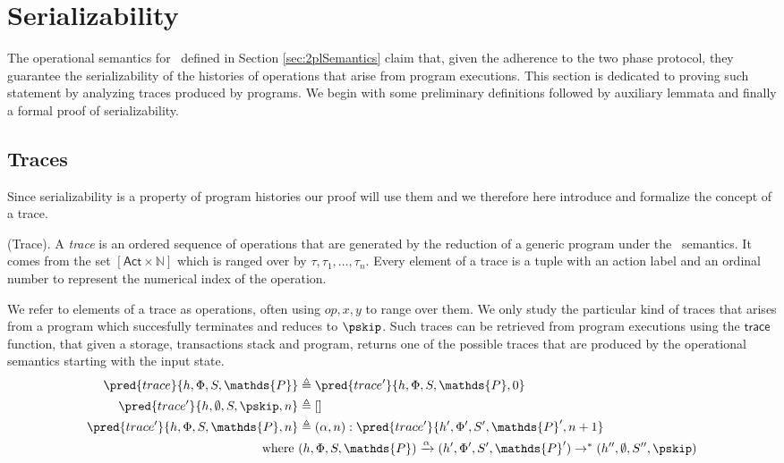 \section{Serializability}

\label{sec:ser}

The operational semantics for \tpl\ defined in Section \ref{sec:2plSemantics} claim that, given the adherence to the two phase protocol, they guarantee the serializability of the histories of operations that arise from program executions. This section is dedicated to proving such statement by analyzing traces produced by programs. We begin with some preliminary definitions followed by auxiliary lemmata and finally a formal proof of serializability.

\tocless\subsection{Traces}

Since serializability is a property of program histories our proof will use them and we therefore here introduce and formalize the concept of a trace.

\begin{defn}
	(Trace).
	A \emph{trace} is an ordered sequence of operations that are generated by the reduction of a generic program under the \tpl\ semantics. It comes from the set $[\mathsf{Act} \times \mathds{N}]$ which is ranged over by $\tau, \tau_1, \ldots, \tau_n$. Every element of a trace is a tuple with an action label and an ordinal number to represent the numerical index of the operation.
\end{defn}

We refer to elements of a trace as operations, often using $op, x, y$ to range over them. We only study the particular kind of traces that arises from a program which succesfully terminates and reduces to $\pskip$. Such traces can be retrieved from program executions using the $\mathsf{trace}$ function, that given a storage, transactions stack and program, returns one of the possible traces that are produced by the operational semantics starting with the input state.
\begin{align*}
	\pred{trace}{h, \Phi, S, \mathds{P}} &\triangleq \pred{trace'}{h, \Phi, S, \mathds{P}, 0} \\
	\pred{trace'}{h, \emptyset, S, \pskip, n} &\triangleq [] \\
	\pred{trace'}{h, \Phi, S, \mathds{P}, n} &\triangleq (\alpha, n) : \pred{trace'}{h', \Phi', S', \mathds{P}', n+ 1}
	\\
	\text{where }& (h, \Phi, S, \mathds{P}) \xrightarrow{\alpha} (h', \Phi', S', \mathds{P}') \rightarrow^* (h'', \emptyset, S'', \pskip)
\end{align*}

